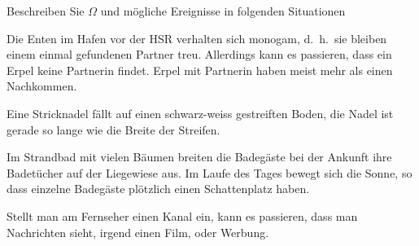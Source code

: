 Beschreiben Sie $\Omega$ und mögliche Ereignisse in folgenden Situationen
\begin{teilaufgaben}
\item
Die Enten im Hafen vor der HSR verhalten sich monogam, d.~h.~sie bleiben einem
einmal gefundenen Partner treu. Allerdings kann es passieren, dass ein
Erpel keine Partnerin findet. Erpel mit Partnerin haben meist mehr
als einen Nachkommen.
\item
Eine Stricknadel fällt auf einen schwarz-weiss gestreiften Boden, die
Nadel ist gerade so lange wie die Breite der Streifen.
\item
Im Strandbad mit vielen Bäumen breiten die Badegäste bei der Ankunft
ihre Badetücher auf der Liegewiese aus.
Im Laufe des Tages bewegt sich die Sonne, so dass
einzelne Badegäste plötzlich einen Schattenplatz haben.
\item
Stellt man am Fernseher einen Kanal ein, kann es passieren, dass
man Nachrichten sieht, irgend einen Film, oder Werbung.
\end{teilaufgaben}

